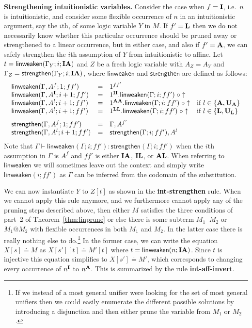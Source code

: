 \documentclass{eptcs}
\makeatletter
\newcommand{\lhat}[1]{\widehat{\;#1\;}}
\newcommand\affapp{{@}}
\newcommand\fI{\textup{$\mathbf{I}$}}
\newcommand\fA{\textup{$\mathbf{A}$}}
\newcommand\fL{\textup{$\mathbf{L}$}}
\newcommand\fUA{{\textup{\textbf{U}}_\textup{\textbf{A}}}}
\newcommand\fUL{{\textup{\textbf{U}}_\textup{\textbf{L}}}}
\theoremstyle{definition}
\makeatother
\begin{document}
\medskip \noindent\textbf{Strengthening intuitionistic variables.}
Consider the case when $f=\fI$, i.e.\ $n$ is intuitionistic, and
consider some flexible occurrence of $n$ in an intuitionistic argument,
say the $i$th, of some logic variable $Y$ in $M$.  If $f'=\fL$ then we
do not necessarily know whether this particular occurrence should be
pruned away or strengthened to a linear occurrence, but in either case,
and also if $f'=\fA$, we can safely
strengthen the $i$th assumption of $Y$ from intuitionistic to affine.
Let $t=\textsf{linweaken}(\Gamma_Y;i;\fI\fA)$ and $Z$ be a fresh logic variable
with $A_Z=A_Y$ and $\Gamma_Z=\textsf{strengthen}(\Gamma_Y;i;\fI\fA)$,
where $\textsf{linweaken}$ and $\textsf{strengthen}$ are defined as
follows:
\[
\begin{array}{llll}
\textsf{linweaken}(\Gamma,A^f;1;ff') &=& 1^{ff'} \\
\textsf{linweaken}(\Gamma,A^\fI;i+1;ff') &=&
1^{\fI\fI}.\textsf{linweaken}(\Gamma;i;ff')\;\circ \uparrow \\
\textsf{linweaken}(\Gamma,A^l;i+1;ff') &=&
1^{\fA\fA}.\textsf{linweaken}(\Gamma;i;ff')\;\circ \uparrow &
\textrm{if }l\in\{\fA,\fUA\} \\
\textsf{linweaken}(\Gamma,A^l;i+1;ff') &=&
1^{\fL\fL}.\textsf{linweaken}(\Gamma;i;ff')\;\circ \uparrow &
\textrm{if }l\in\{\fL,\fUL\}
\\[1.5ex]
\textsf{strengthen}(\Gamma,A^f;1;ff') &=& \Gamma,A^{f'} \\
\textsf{strengthen}(\Gamma,A^l;i+1;ff') &=& \textsf{strengthen}(\Gamma;i;ff'),A^l \\
\end{array}
\]
Note that $\Gamma\vdash\textsf{linweaken}(\Gamma;i;ff') :
\textsf{strengthen}(\Gamma;i;ff')$ when the $i$th assumption in $\Gamma$
is $A^f$ and $ff'$ is either $\fI\fA$, $\fI\fL$, or $\fA\fL$.  When
referring to $\textsf{linweaken}$ we will sometimes leave out the context
and simply write $\textsf{linweaken}(i;ff')$ as $\Gamma$ can be
inferred from the codomain of the substitution.

We can now instantiate $Y$ to $Z[t]$ as shown in the
\textbf{int-strengthen} rule.
When we cannot apply this rule anymore, and we furthermore cannot apply
any of the pruning steps described above, then either $M$ satisfies the
three conditions of part~2 of Theorem~\ref{thm:linprune} or else there
is some subterm $M_1\lhat{}M_2$ or $M_1\affapp{}M_2$ with flexible
occurrences in both $M_1$ and $M_2$.  In the latter case there is really
nothing else to do.\footnote{If we instead of a most general unifier
  were looking for the set of most general unifiers then we could
  easily enumerate the different possible solutions by introducing a
  disjunction and then either prune the variable from $M_1$ or $M_2$.}
In the former case, we can write the equation $X[s]\doteq M$ as
$X[s'][t]\doteq M'[t]$ where
$t=\textsf{linweaken}(n;\fI\fA)$.  Since $t$ is injective this equation
simplifies to $X[s']\doteq M'$, which corresponds to changing
every occurrence of $n^\fI$ to $n^\fA$.  This is
summarized by the rule \textbf{int-aff-invert}.
\end{document}
